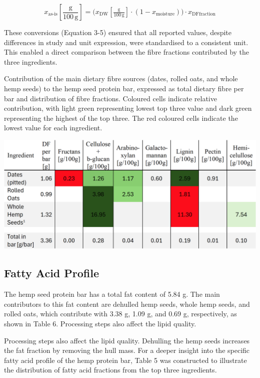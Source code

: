 \begin{equation}
    x_{\text{as-is}}\!\left[\frac{\mathrm{g}}{100\,\mathrm{g}}\right]
    = \bigl( x_{\mathrm{DW}}\!\left[\tfrac{\mathrm{g}}{100\,\mathrm{g}}\right]
    \cdot (1 - x_{\text{moisture}}) \bigr)
    \cdot x_{\text{DFfraction}}
    \label{eq:asis_dffraction}
    \end{equation}

    These conversions (Equation 3-5) ensured that all reported values, despite differences in study and unit expression, were standardised to a consistent unit. This enabled a direct comparison between the fibre fractions contributed by the three ingredients. 

\begin{table}[H]
    \centering
    \caption{Contribution of the main dietary fibre sources (dates, rolled oats, and whole hemp seeds) to the hemp seed protein bar,
    expressed as total dietary fibre per bar and distribution of fibre fractions. Coloured cells indicate relative contribution, with light
    green representing lowest top three value and dark green representing the highest of the top three. The red coloured cells indicate the
    lowest value for each ingredient.}
    \label{tab:df_tab_01}
    \includegraphics[width=\linewidth]{Figures/tab_df_01.png}
\end{table}

\subsection{Fatty Acid Profile}
The hemp seed protein bar has a total fat content of 5.84 g. The main contributors to this fat content
are dehulled hemp seeds, whole hemp seeds, and rolled oats, which contribute with 3.38 g, 1.09 g,
and 0.69 g, respectively, as shown in Table 6. Processing steps also affect the lipid quality.

\vspace{1em}
Processing steps also affect the lipid quality. Dehulling the hemp seeds increases the fat fraction by removing the hull mass. For a deeper insight into the specific fatty acid profile of the hemp protein bar, Table 5 was constructed to illustrate the distribution of fatty acid fractions from the top three ingredients. 


